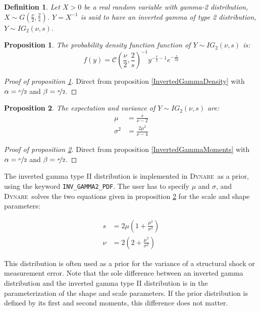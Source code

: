 \documentclass{amsart}
\theoremstyle{plain}
\newtheorem{proposition}{Proposition}[section]
\newtheorem{definition}{Definition}[section]
\theoremstyle{remark}
\numberwithin{equation}{section}
\newcommand{\Dynare}{\textsc{Dynare}}
\begin{document}
\begin{definition}\label{InvertedGamma2}
  Let $X>0$ be a real random variable with gamma-2 distribution, $X\sim G\left(\frac{\nu}{2},\frac{2}{s}\right)$. $Y = X^{-1}$ is said to have an inverted gamma of type 2 distribution, $Y\sim IG_2(\nu, s)$.
\end{definition}

\begin{proposition}\label{InvertedGamma2Density}
  The probability density function function of $Y\sim IG_2(\nu, s)$ is:
  \[
    f(y) = \mathcal C\left(\frac{\nu}{2}, \frac{2}{s}\right)^{-1}y^{-\frac{\nu}{2}-1}e^{-\frac{s}{2 y}}
  \]
\end{proposition}

\begin{proof}[Proof of proposition \ref{InvertedGamma2Density}]
  Direct from proposition \ref{InvertedGammaDensity} with $\alpha=\nicefrac{\nu}{2}$ and $\beta=\nicefrac{s}{2}$.
\end{proof}

\begin{proposition}\label{InvertedGamma2Moments}
  The expectation and variance of $Y\sim IG_2(\nu, s)$ are:
  \[
    \begin{split}
      \mu &= \frac{s}{\nu-2}\\
      \sigma^2 &= \frac{2\mu^2}{\nu-4}
    \end{split}
  \]
\end{proposition}

\begin{proof}[Proof of proposition \ref{InvertedGamma2Moments}]
  Direct from proposition \ref{InvertedGammaMoments} with $\alpha=\nicefrac{\nu}{2}$ and $\beta=\nicefrac{s}{2}$.
\end{proof}

The inverted gamma type II distribution is implemented in \Dynare\ as a prior, using the
keyword \verb+INV_GAMMA2_PDF+. The user has to specify $\mu$ and $\sigma$, and \Dynare\ solves the
two equations given in proposition \ref{InvertedGamma2Moments} for the scale and shape parameters:

\begin{equation}
  \begin{split}
    s &= 2\mu\left(1+\frac{\mu^2}{\sigma^2}\right)\\
    \nu &= 2\left(2+\frac{\mu^2}{\sigma^2}\right)
  \end{split}
\end{equation}

This distribution is often used as a prior for the variance of a structural shock
or measurement error. Note that the sole difference between an inverted gamma
distribution and the inverted gamma type II distribution is in the parameterization of the
shape and scale parameters. If the prior distribution is defined by its first and
second moments, this difference does not matter.\newline
\end{document}
